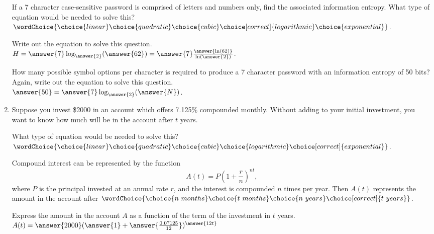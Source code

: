 \documentclass{ximera}
\begin{document}
\begin{exercise}
\begin{enumerate}
If a 7 character case-sensitive password is comprised of letters and numbers only, find the
associated information entropy.
What type of equation would be needed to solve this?\\
$\wordChoice{\choice{linear}\choice{quadratic}\choice{cubic}\choice[correct]{logarithmic}\choice{exponential}}$.
\begin{exercise}
Write out the equation to solve this question.\\
$H = \answer{7}\log_{\answer{2}}(\answer{62}) = \answer{7}\frac{\answer{\ln(62)}}{\ln(\answer{2})}$.

\begin{exercise}
How many possible symbol options per character is required to produce a 7 character password
with an information entropy of 50 bits?\\
Again, write out the equation to solve this question.\\
$\answer{50} = \answer{7}\log_{\answer{2}}(\answer{N})$.
\end{exercise}
\end{exercise}


\item Suppose you invest \$2000 in an account which offers 7.125\% compounded monthly. Without adding to your initial investment, you want to know how much will be in the account after $t$ years. 

What type of equation would be needed to solve this?\\
$\wordChoice{\choice{linear}\choice{quadratic}\choice{cubic}\choice{logarithmic}\choice[correct]{exponential}}$.
\begin{exercise}
Compound interest can be represented by the function
$$A(t) = P\left(1+\frac{r}{n}\right)^{nt},$$
where $P$ is the principal invested at an annual rate $r$, and the interest is compounded $n$ times per year. Then $A(t)$ represents the amount in the account after
%
$\wordChoice{\choice{n \ months}\choice{t \ months}\choice{n \ years}\choice[correct]{t \ years}}$.

\begin{exercise}
Express the amount in the account $A$ as a function of the term of the investment in $t$ years.\\
$A(t) = \answer{2000}(\answer{1}+ \answer{\frac{0.07125}{12}})^{\answer{12t}}$
\end{exercise}
\end{exercise}


\end{enumerate}

\end{exercise}
\end{document}
